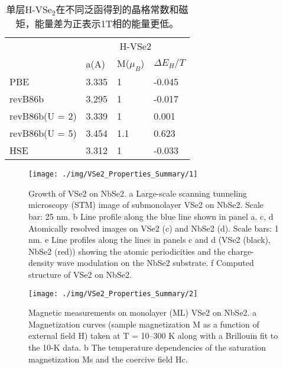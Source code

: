 \documentclass[reprint, aps, prb, showkeys]{revtex4-2}
\begin{document}
\begin{table}[]
    \caption{\label{table:Kezilebieke2020_PhaseTest} 单层H-VSe$_2$在不同泛函得到的晶格常数和磁矩，能量差为正表示1T相的能量更低。}
    \begin{ruledtabular}
    \begin{tabular}{llll}
                   & \multicolumn{3}{c}{H-VSe2}          \\
                   & a(A)  & M($\mu_B$) & $\Delta E_H/T$ \\
    \hline
    PBE            & 3.335 & 1          & -0.045         \\
    revB86b        & 3.295 & 1          & -0.017         \\
    revB86b(U = 2) & 3.339 & 1          & 0.001          \\
    revB86b(U = 5) & 3.454 & 1.1        & 0.623          \\
    HSE            & 3.312 & 1          & -0.033        
    \end{tabular}
    \end{ruledtabular}
\end{table}

\begin{figure*}
    \texttt{[image: ./img/VSe2\_Properties\_Summary/1]}
    \caption{\label{fig:Kezilebieke2020_Structure} 
    Growth of VSe2 on NbSe2. a Large-scale scanning tunneling microscopy (STM) image of submonolayer VSe2 on NbSe2. Scale bar: 25 nm. b Line profile along the blue line shown in panel a. c, d Atomically resolved images on VSe2 (c) and NbSe2 (d). Scale bars: 1 nm. e Line profiles along the lines in panels c and d (VSe2 (black), NbSe2 (red)) showing the atomic periodicities and the charge-density wave modulation on the NbSe2 substrate. f Computed structure of VSe2 on NbSe2.
    }
\end{figure*}

\begin{figure}
    \texttt{[image: ./img/VSe2\_Properties\_Summary/2]}
    \caption{\label{fig:Kezilebieke2020_Magmum} 
    Magnetic measurements on monolayer (ML) VSe2 on NbSe2. a Magnetization curves (sample magnetization M as a function of external field H) taken at T = 10–300 K along with a Brillouin fit to the 10-K data. b The temperature dependencies of the saturation magnetization Ms and
the coercive field Hc.
    }
\end{figure}
\end{document}
